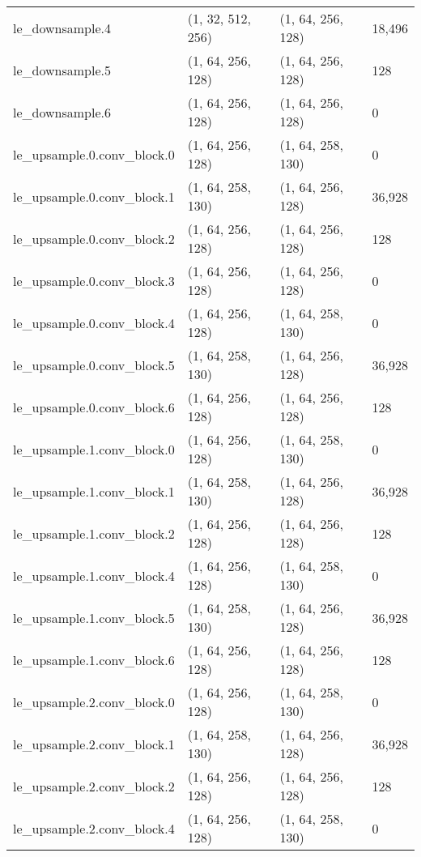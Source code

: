 \begin{longtable}{llll}
                    le\_downsample.4 &  (1, 32, 512, 256) &  (1, 64, 256, 128) &      18,496 \\
                    le\_downsample.5 &  (1, 64, 256, 128) &  (1, 64, 256, 128) &         128 \\
                    le\_downsample.6 &  (1, 64, 256, 128) &  (1, 64, 256, 128) &           0 \\
        le\_upsample.0.conv\_block.0 &  (1, 64, 256, 128) &  (1, 64, 258, 130) &           0 \\
        le\_upsample.0.conv\_block.1 &  (1, 64, 258, 130) &  (1, 64, 256, 128) &      36,928 \\
        le\_upsample.0.conv\_block.2 &  (1, 64, 256, 128) &  (1, 64, 256, 128) &         128 \\
        le\_upsample.0.conv\_block.3 &  (1, 64, 256, 128) &  (1, 64, 256, 128) &           0 \\
        le\_upsample.0.conv\_block.4 &  (1, 64, 256, 128) &  (1, 64, 258, 130) &           0 \\
        le\_upsample.0.conv\_block.5 &  (1, 64, 258, 130) &  (1, 64, 256, 128) &      36,928 \\
        le\_upsample.0.conv\_block.6 &  (1, 64, 256, 128) &  (1, 64, 256, 128) &         128 \\
        le\_upsample.1.conv\_block.0 &  (1, 64, 256, 128) &  (1, 64, 258, 130) &           0 \\
        le\_upsample.1.conv\_block.1 &  (1, 64, 258, 130) &  (1, 64, 256, 128) &      36,928 \\
        le\_upsample.1.conv\_block.2 &  (1, 64, 256, 128) &  (1, 64, 256, 128) &         128 \\
        le\_upsample.1.conv\_block.4 &  (1, 64, 256, 128) &  (1, 64, 258, 130) &           0 \\
        le\_upsample.1.conv\_block.5 &  (1, 64, 258, 130) &  (1, 64, 256, 128) &      36,928 \\
        le\_upsample.1.conv\_block.6 &  (1, 64, 256, 128) &  (1, 64, 256, 128) &         128 \\
        le\_upsample.2.conv\_block.0 &  (1, 64, 256, 128) &  (1, 64, 258, 130) &           0 \\
        le\_upsample.2.conv\_block.1 &  (1, 64, 258, 130) &  (1, 64, 256, 128) &      36,928 \\
        le\_upsample.2.conv\_block.2 &  (1, 64, 256, 128) &  (1, 64, 256, 128) &         128 \\
        le\_upsample.2.conv\_block.4 &  (1, 64, 256, 128) &  (1, 64, 258, 130) &           0 \\

\end{longtable}
